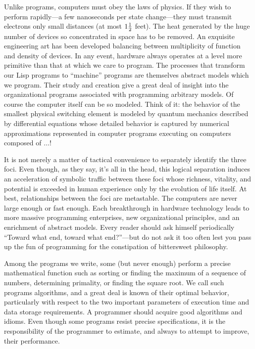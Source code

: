 Unlike programs, computers must obey the laws of physics.  If they wish to
perform rapidly---a few nanoseconds per state change---they must transmit
electrons only small distances (at most \( 1 {1\over2} \) feet). The heat generated by
the huge number of devices so concentrated in space has to be removed.  An
exquisite engineering art has been developed balancing between multiplicity of
function and density of devices.  In any event, hardware always operates at a
level more primitive than that at which we care to program.  The processes that
transform our Lisp programs to ``machine'' programs are themselves abstract
models which we program.  Their study and creation give a great deal of insight
into the organizational programs associated with programming arbitrary models.
Of course the computer itself can be so modeled.  Think of it: the behavior of
the smallest physical switching element is modeled by quantum mechanics
described by differential equations whose detailed behavior is captured by
numerical approximations represented in computer programs executing on
computers composed of \( \dots \)!

It is not merely a matter of tactical convenience to separately identify the
three foci.  Even though, as they say, it's all in the head, this logical
separation induces an acceleration of symbolic traffic between these foci whose
richness, vitality, and potential is exceeded in human experience only by the
evolution of life itself.  At best, relationships between the foci are
metastable.  The computers are never large enough or fast enough.  Each
breakthrough in hardware technology leads to more massive programming
enterprises, new organizational principles, and an enrichment of abstract
models.  Every reader should ask himself periodically ``Toward what end, toward
what end?''---but do not ask it too often lest you pass up the fun of
programming for the constipation of bittersweet philosophy.

Among the programs we write, some (but never enough) perform a precise
mathematical function such as sorting or finding the maximum of a sequence of
numbers, determining primality, or finding the square root.  We call such
programs algorithms, and a great deal is known of their optimal behavior,
particularly with respect to the two important parameters of execution time and
data storage requirements.  A programmer should acquire good algorithms and
idioms.  Even though some programs resist precise specifications, it is the
responsibility of the programmer to estimate, and always to attempt to improve,
their performance.

